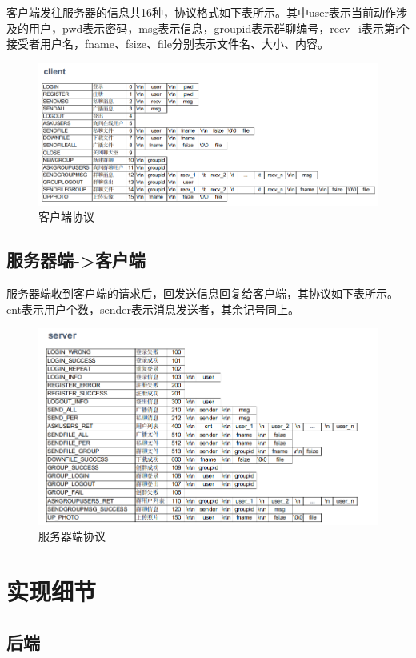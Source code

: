 \documentclass[12pt]{article} %
\begin{document}
\begin{sloppypar}
客户端发往服务器的信息共16种，协议格式如下表所示。其中user表示当前动作涉及的用户，pwd表示密码，msg表示信息，groupid表示群聊编号，recv\_i表示第i个接受者用户名，fname、fsize、file分别表示文件名、大小、内容。

\begin{figure}[h]
	\centering
	\includegraphics[width=0.9\linewidth]{figure/client.png}
	\caption{客户端协议}
\end{figure}
\vspace*{-1cm}

\subsection{服务器端->客户端}
服务器端收到客户端的请求后，回发送信息回复给客户端，其协议如下表所示。cnt表示用户个数，sender表示消息发送者，其余记号同上。
\begin{figure}[h]
	\centering
	\includegraphics[width=0.9\linewidth]{figure/server.png}
	\caption{服务器端协议}
\end{figure}

\section{实现细节}
\label{sec:detials}

\subsection{后端}


\end{sloppypar}
\end{document}
